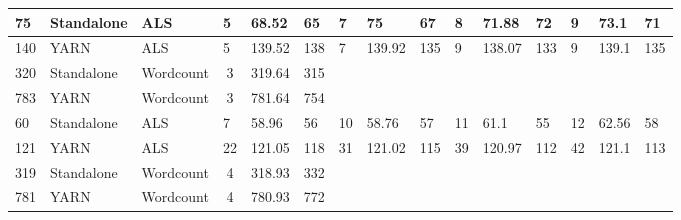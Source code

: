 \documentclass[conference]{IEEEtran}
\begin{document}
\begin{table*}[!ht]
{{\begin{tabular}{|l|l|l|c|l|l|l|l|l|l|l|l|l|l|l}
75                   & Standalone                                 & ALS                                       & \multicolumn{1}{l|}{5}  & 68.52     & 65        & 7                      & 75     & 67        & 8  & 71.88     & 72        & 9  & 73.1      & \multicolumn{1}{l|}{71}        \\ \hline
140                  & YARN                                       & ALS                                       & \multicolumn{1}{l|}{5}  & 139.52    & 138       & 7                      & 139.92    & 135       & 9  & 138.07    & 133       & 9  & 139.1     & \multicolumn{1}{l|}{135}       \\ \hline
320                  & Standalone                                 & Wordcount                                     & 3                       & 319.64    & 315       & \multicolumn{9}{l|}{\multirow{2}{*}{}}                                                                                        \\ \cline{1-6}
783                  & YARN                                       & Wordcount                                     & 3                       & 781.64    & 754       & \multicolumn{9}{l|}{}                                                                                                         \\ \hline
60                   & Standalone                                 & ALS                                       & \multicolumn{1}{l|}{7}  & 58.96     & 56        & 10                     & 58.76     & 57        & 11 & 61.1      & 55        & 12 & 62.56     & \multicolumn{1}{l|}{58}        \\ \hline
121                  & YARN                                       & ALS                                       & \multicolumn{1}{l|}{22} & 121.05    & 118       & 31                     & 121.02    & 115       & 39 & 120.97    & 112       & 42 & 121.1     & \multicolumn{1}{l|}{113}       \\ \hline
319                  & Standalone                                 & Wordcount                                     & 4                       & 318.93    & 332       & \multicolumn{9}{l|}{\multirow{2}{*}{}}                                                                                        \\ \cline{1-6}
781                  & YARN                                       & Wordcount                                     & 4                       & 780.93    &  772         & \multicolumn{9}{l|}{}                                                                                                         \\ \hline
\end{tabular}}}
\label{table:minimize}
\end{table*}
\end{document}
